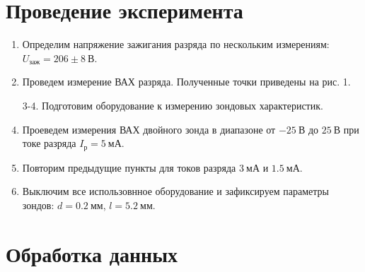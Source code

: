 \documentclass[14pt, a4paper]{report}
\begin{document}
\section{Проведение эксперимента}

\begin{enumerate}

\setcounter{enumi}{0}

\item Определим напряжение зажигания разряда по нескольким измерениям: $U_{заж}=206\pm8\ В$.

\item Проведем измерение ВАХ разряда. Полученные точки приведены на рис. 1.

\item[3-4.] Подготовим оборудование к измерению зондовых характеристик.

\setcounter{enumi}{4}

\item Проеведем измерения ВАХ двойного зонда в диапазоне от $-25\ В$ до $25\ В$ при токе разряда $I_р=5\ мА$.

\item Повторим предыдущие пункты для токов разряда $3\ мА$ и $1.5\ мА$.

\item Выключим все использовнное оборудование и зафиксируем параметры зондов: $d=0.2\ мм$, $l=5.2\ мм$.

\end{enumerate}

\section{Обработка данных}
\end{document}
